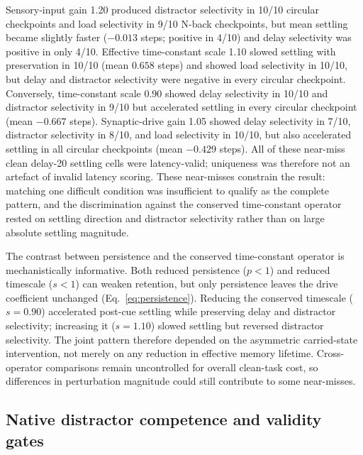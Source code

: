 \documentclass[11pt,reprint,aps,prl,floatfix,secnumarabic]{revtex4-2}
\begin{document}
Sensory-input gain 1.20 produced distractor selectivity in 10/10 circular
checkpoints and load selectivity in 9/10 N-back checkpoints, but mean settling
became slightly faster ($-0.013$ steps; positive in 4/10) and delay
selectivity was positive in only 4/10. Effective time-constant scale 1.10
slowed settling with preservation in 10/10 (mean $0.658$ steps) and showed load
selectivity in 10/10, but delay and distractor selectivity were negative in
every circular checkpoint. Conversely, time-constant scale 0.90 showed delay
selectivity in 10/10 and distractor selectivity in 9/10 but accelerated
settling in every circular checkpoint (mean $-0.667$ steps). Synaptic-drive
gain 1.05 showed delay selectivity in 7/10, distractor selectivity in 8/10,
and load selectivity in 10/10, but also accelerated settling in all circular
checkpoints (mean $-0.429$ steps). All of
these near-miss clean delay-20 settling cells were latency-valid; uniqueness
was therefore not an artefact of invalid latency scoring. These near-misses
constrain the result: matching one difficult condition was insufficient to
qualify as the complete pattern, and the discrimination against the conserved
time-constant operator rested on settling direction and distractor selectivity
rather than on large absolute settling magnitude.

The contrast between persistence and the conserved time-constant operator is
mechanistically informative. Both reduced persistence ($p<1$) and reduced
timescale ($s<1$) can weaken retention, but only persistence leaves the drive
coefficient unchanged (Eq.~\ref{eq:persistence}). Reducing the conserved
timescale ($s=0.90$) accelerated post-cue settling while preserving delay and
distractor selectivity; increasing it ($s=1.10$) slowed settling but reversed
distractor selectivity. The joint pattern therefore depended on the asymmetric
carried-state intervention, not merely on any reduction in effective memory
lifetime. Cross-operator comparisons remain uncontrolled for overall clean-task
cost, so differences in perturbation magnitude could still contribute to some
near-misses.

\subsection{Native distractor competence and validity gates}
\end{document}
